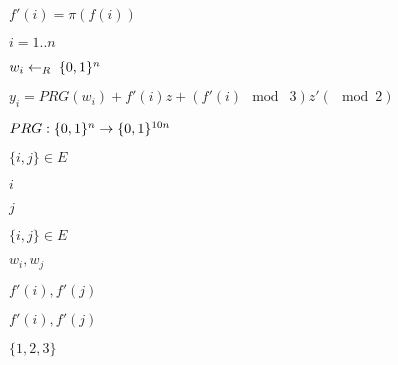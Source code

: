 \documentclass[10pt]{book}
\begin{document}
\begin{mdSnippets}
\begin{mdInlineSnippet}%
$f'(i)=\pi(f(i))$\end{mdInlineSnippet}%
\begin{mdInlineSnippet}[9284220ad3b340f2b5cc5c20d995c906]%
$i=1..n$\end{mdInlineSnippet}%
\begin{mdInlineSnippet}%
$w_i \leftarrow_R\; \{0,1\}^n$\end{mdInlineSnippet}%
\begin{mdInlineSnippet}[a3b48626cd7d9e0ddcecc07882e86e83]%
$y_i = PRG(w_i)+f'(i)z +(f'(i) \mod\; 3)z' (\mod 2)$\end{mdInlineSnippet}%
\begin{mdInlineSnippet}%
$PRG:\{0,1\}^n\rightarrow\{0,1\}^{10n}$\end{mdInlineSnippet}%
\begin{mdInlineSnippet}%
$\{i,j \} \in E$\end{mdInlineSnippet}%
\begin{mdInlineSnippet}[865c0c0b4ab0e063e5caa3387c1a8741]%
$i$\end{mdInlineSnippet}%
\begin{mdInlineSnippet}[363b122c528f54df4a0446b6bab05515]%
$j$\end{mdInlineSnippet}%
\begin{mdInlineSnippet}[321e8be9a994456a2d7febe17e8f51d5]%
$\{i,j\}\in E$\end{mdInlineSnippet}%
\begin{mdInlineSnippet}[9d66b5380a1702859617b42a06f59053]%
$w_i,w_j$\end{mdInlineSnippet}%
\begin{mdInlineSnippet}[c1a25628b4ffe5de632d3ed76c6a8c0f]%
$f'(i),f'(j)$\end{mdInlineSnippet}%
\begin{mdInlineSnippet}[c1a25628b4ffe5de632d3ed76c6a8c0f]%
$f'(i),f'(j)$\end{mdInlineSnippet}%
\begin{mdInlineSnippet}[1d4734bc6db8002e08e28eec76ab0b7a]%
$\{1,2,3\}$\end{mdInlineSnippet}%

\end{mdSnippets}
\end{document}
